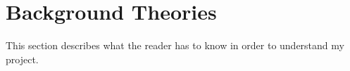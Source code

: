 \section{Background Theories} 

This section describes what the reader has to know in order to understand my project.